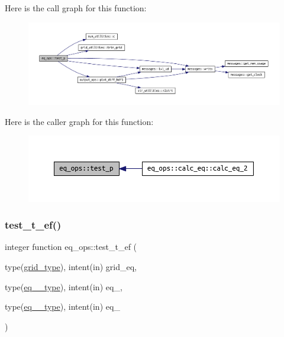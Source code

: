 Here is the call graph for this function\+:
\nopagebreak
\begin{figure}[H]
\begin{center}
\leavevmode
\includegraphics[width=350pt]{namespaceeq__ops_a38b723f6ed5d2e2772c9c3ad14d5ffd4_cgraph}
\end{center}
\end{figure}
Here is the caller graph for this function\+:
\nopagebreak
\begin{figure}[H]
\begin{center}
\leavevmode
\includegraphics[width=350pt]{namespaceeq__ops_a38b723f6ed5d2e2772c9c3ad14d5ffd4_icgraph}
\end{center}
\end{figure}
\mbox{\label{namespaceeq__ops_a1f5049c3e309fa23ee46fd116c9344f1}} 
\subsubsection{\texorpdfstring{test\+\_\+t\+\_\+ef()}{test\_t\_ef()}}
{\footnotesize\ttfamily integer function eq\+\_\+ops\+::test\+\_\+t\+\_\+ef (\begin{DoxyParamCaption}\item[{type(\hyperlink{structgrid__vars_1_1grid__type}{grid\+\_\+type}), intent(in)}]{grid\+\_\+eq,  }\item[{type(\hyperlink{structeq__vars_1_1eq__1__type}{eq\+\_\+1\+\_\+type}), intent(in)}]{eq\+\_,  }\item[{type(\hyperlink{structeq__vars_1_1eq__2__type}{eq\+\_\+2\+\_\+type}), intent(in)}]{eq\+\_ }\end{DoxyParamCaption})}



